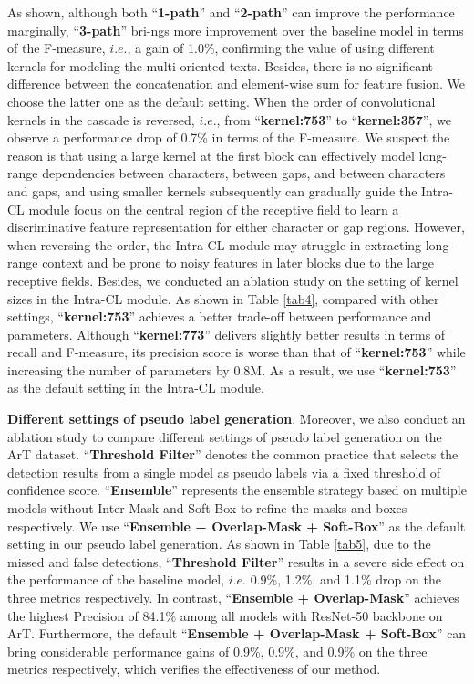 As shown, although both ``\textbf{1-path}'' and ``\textbf{2-path}'' can improve the performance marginally, ``\textbf{3-path}'' bri-ngs more improvement over the baseline model in terms of the F-measure, $i.e.$, a gain of 1.0\%, confirming the value of using different kernels for modeling the multi-oriented texts. Besides, there is no significant difference between the concatenation and element-wise sum for feature fusion. We choose the latter one as the default setting. When the order of convolutional kernels in the cascade is reversed, $i.e.$, from ``\textbf{kernel:753}'' to ``\textbf{kernel:357}'', we observe a performance drop of 0.7\% in terms of the F-measure. We suspect the reason is that using a large kernel at the first block can effectively model long-range dependencies between characters, between gaps, and between characters and gaps, and using smaller kernels subsequently can gradually guide the Intra-CL module focus on the central region of the receptive field to learn a discriminative feature representation for either character or gap regions. However, when reversing the order, the Intra-CL module may struggle in extracting long-range context and be prone to noisy features in later blocks due to the large receptive fields. Besides, we conducted an ablation study on the setting of kernel sizes in the Intra-CL module. As shown in Table \ref{tab4}, compared with other settings, ``\textbf{kernel:753}'' achieves a better trade-off between performance and parameters. Although ``\textbf{kernel:773}'' delivers slightly better results in terms of recall and F-measure, its precision score is worse than that of ``\textbf{kernel:753}'' while increasing the number of parameters by 0.8M. As a result, we use ``\textbf{kernel:753}'' as the default setting in the Intra-CL module.


\textbf{Different settings of pseudo label generation}. Moreover, we also conduct an ablation study to compare different settings of pseudo label generation on the ArT dataset. ``\textbf{Threshold Filter}'' denotes the common practice that selects the detection results from a single model as pseudo labels via a fixed threshold of confidence score. ``\textbf{Ensemble}'' represents the ensemble strategy based on multiple models without Inter-Mask and Soft-Box to refine the masks and boxes respectively. We use ``\textbf{Ensemble + Overlap-Mask + Soft-Box}'' as the default setting in our pseudo label generation. As shown in Table \ref{tab5}, due to the missed and false detections, ``\textbf{Threshold Filter}'' results in a severe side effect on the performance of the baseline model, $i.e.$ 0.9\%, 1.2\%, and 1.1\% drop on the three metrics respectively. In contrast, ``\textbf{Ensemble + Overlap-Mask}'' achieves the highest Precision of 84.1\% among all models with ResNet-50 backbone on ArT. Furthermore, the default ``\textbf{Ensemble + Overlap-Mask + Soft-Box}'' can bring considerable performance gains of 0.9\%, 0.9\%, and 0.9\% on the three metrics respectively, which verifies the effectiveness of our method.



